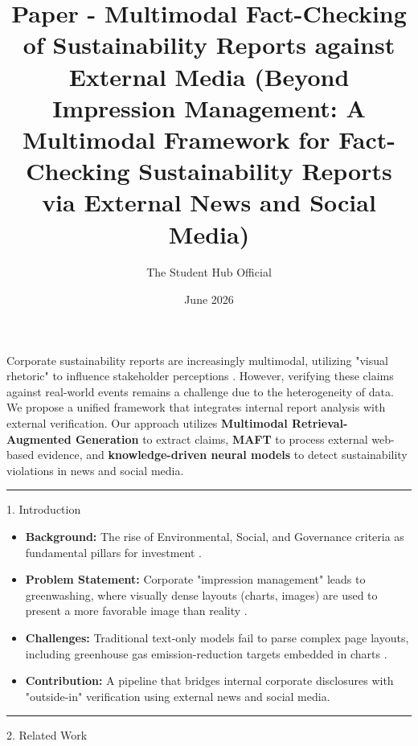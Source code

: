 \documentclass{article}
\title{Paper - Multimodal Fact-Checking of Sustainability Reports against External Media (Beyond Impression Management: A Multimodal Framework for Fact-Checking Sustainability Reports via External News and Social Media)}
\author{The Student Hub Official}
\date{June 2026}
\begin{document}
\maketitleAbstract

Corporate sustainability reports are increasingly multimodal, utilizing "visual rhetoric" to influence stakeholder perceptions  \parencite{bingjie_li_487d69fd}. However, verifying these claims against real-world events remains a challenge due to the heterogeneity of data. We propose a unified framework that integrates internal report analysis with external verification. Our approach utilizes \textbf{Multimodal Retrieval-Augmented Generation}  \parencite{mohammad_mahdavi_619c09a8} to extract claims, \textbf{MAFT}  \parencite{kazuya_kakizaki_4193ad80} to process external web-based evidence, and \textbf{knowledge-driven neural models}  \parencite{abir_naskar_17efeb7b} to detect sustainability violations in news and social media.
\begin{center}\rule{\linewidth}{0.5pt}\end{center}
1. Introduction
\begin{itemize}
\item 

\textbf{Background:} The rise of Environmental, Social, and Governance criteria as fundamental pillars for investment  \parencite{g_saipooja_m_n_488bfdd6}.\item 

\textbf{Problem Statement:} Corporate "impression management" leads to greenwashing, where visually dense layouts (charts, images) are used to present a more favorable image than reality  \parencite{bingjie_li_487d69fd}.\item 

\textbf{Challenges:} Traditional text-only models fail to parse complex page layouts, including greenhouse gas emission-reduction targets embedded in charts  \parencite[]{tanay_gupta_aafe0c6a, lars_wilhelmi_8d7e860b}.\item 

\textbf{Contribution:} A pipeline that bridges internal corporate disclosures with "outside-in" verification using external news and social media.
\end{itemize}
\begin{center}\rule{\linewidth}{0.5pt}\end{center}
2. Related Work
\end{document}
